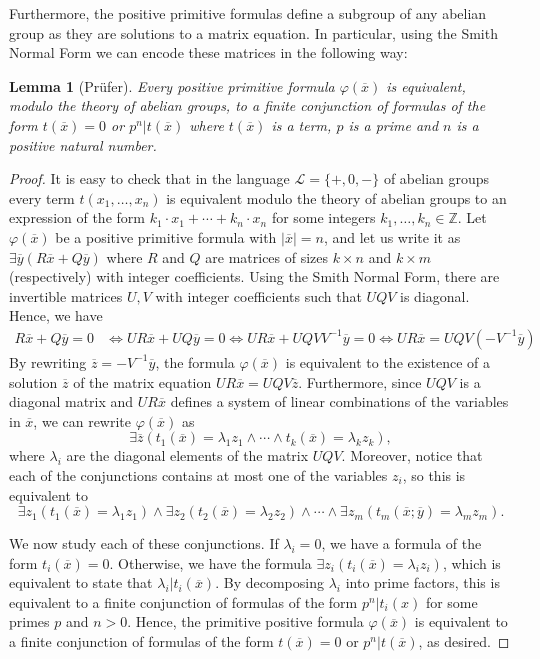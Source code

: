 \documentclass[10pt,a4paper]{amsart}
\newtheorem{lema}[prop]{Lemma}
\theoremstyle{definition}
\newcommand{\bl}{\begin{lema}}
\newcommand{\el}{\end{lema}}
\newcommand{\bdem}{\begin{proof}}
\newcommand{\edem}{\end{proof}}
\newcommand{\ov}[1]{\overline{#1}}
\newcommand{\Le}{\mathcal{L}}
\begin{document}
Furthermore, the positive primitive formulas define a subgroup of any abelian group as they are solutions to a matrix equation. In particular, using the Smith Normal Form we can encode these matrices in the following way:
\bl [Prüfer] \label{PruferPPF} Every positive primitive formula $\varphi(\ov{x})$ is equivalent, modulo the theory of abelian groups, to a finite conjunction of formulas of the form $t(\ov{x})=0$ or $p^n|t(\ov{x})$ where $t(\ov{x})$ is a term, $p$ is a prime and $n$ is a positive natural number.
\el
\bdem It is easy to check that in the language $\Le=\{+,0,-\}$ of abelian groups every term $t(x_1,\ldots,x_n)$ is equivalent modulo the theory of abelian groups to an expression of the form $k_1\cdot x_1+\cdots+k_n\cdot x_n$ for some integers $k_1,\ldots,k_n\in\mathbb{Z}$. Let $\varphi(\ov{x})$ be a positive primitive formula with $|\ov{x}|=n$, and let us write it as $\exists \ov{y}(R\ov{x}+Q\ov{y})$ where $R$ and $Q$ are matrices of sizes $k\times n$ and $k\times m$ (respectively) with integer coefficients. Using the Smith Normal Form, there are invertible matrices $U,V$ with integer coefficients such that $UQV$ is diagonal. Hence, we have
\begin{align*}
R\ov{x}+Q\ov{y}=0&\Leftrightarrow UR\ov{x}+UQ\ov{y}=0\Leftrightarrow UR\ov{x}+UQVV^{-1}\ov{y}=0\Leftrightarrow UR\ov{x}=UQV(-V^{-1}\ov{y})
\end{align*}
By rewriting $\ov{z}=-V^{-1}\ov{y}$, the formula $\varphi(\ov{x})$ is equivalent to the existence of a solution $\ov{z}$ of the matrix equation $UR\ov{x}=UQV\ov{z}$. Furthermore, since $UQV$ is a diagonal matrix and $UR\ov{x}$ defines a system of linear combinations of the variables in $\ov{x}$, we can rewrite $\varphi(\ov{x})$ as
\[\exists \ov{z}(t_1(\ov{x})=\lambda_1z_1\wedge \cdots \wedge t_k(\ov{x})=\lambda_kz_k),\]
where $\lambda_i$ are the diagonal elements of the matrix $UQV$. Moreover, notice that each of the conjunctions contains at most one of the variables $z_i$, so this is equivalent to
\[\exists z_1(t_1(\ov{x})=\lambda_1z_1) \wedge \exists z_2(t_2(\ov{x})=\lambda_2z_2)\wedge \cdots \wedge \exists z_m(t_m(\ov{x};\ov{y})=\lambda_mz_m).\]

We now study each of these conjunctions. If $\lambda_i=0$, we have a formula of the form $t_i(\ov{x})=0$. Otherwise, we have the formula $\exists z_i(t_i(\ov{x})=\lambda_iz_i)$, which is equivalent to state that $\lambda_i|t_i(\ov{x})$. By decomposing $\lambda_i$ into prime factors, this is equivalent to a finite conjunction of formulas of the form $p^n|t_i(x)$ for some primes $p$ and $n>0$. Hence, the primitive positive formula $\varphi(\ov{x})$ is equivalent to a finite conjunction of formulas of the form $t(\ov{x})=0$ or $p^n|t(\ov{x})$, as desired.
\edem
\end{document}
